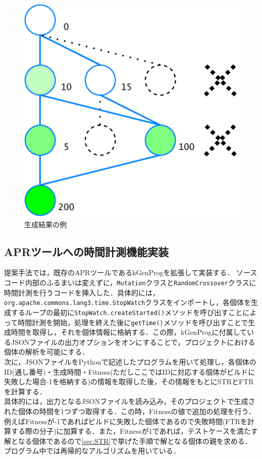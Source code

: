 \documentclass[uplatex,dvipdfmx,a4paper]{jsarticle}
\let\oldcite\cite
\renewcommand{\cite}[1]{\xspace\oldcite{#1}}
\begin{document}
\begin{figure}[t]
  \centering
  \includegraphics[width=\linewidth]{fig/astSample_STR.pdf}
  \caption{生成結果の例}
  \label{fig:example_STR}
\end{figure}
\subsection{APRツールへの時間計測機能実装} \label{sec:impl}
提案手法では，既存のAPRツールであるkGenProg\cite{higo2018kgenprog}を拡張して実装する．
ソースコード内部のふるまいは変えずに，\texttt{Mutation}クラスと\texttt{RandomCrossover}クラスに時間計測を行うコードを挿入した．具体的には，\texttt{org.apache.commons.lang3.time.StopWatch}クラスをインポートし，各個体を生成するループの最初に\texttt{StopWatch.createStarted()}メソッドを呼び出すことによって時間計測を開始，処理を終えた後に\texttt{getTime()}メソッドを呼び出すことで生成時間を取得し，それを個体情報に格納する．この際，kGenProgに付属しているJSONファイルの出力オプションをオンにすることで，プロジェクトにおける個体の解析を可能にする．\\
次に，JSONファイルをPythonで記述したプログラムを用いて処理し，各個体のID(通し番号)・生成時間・Fitness(ただしここではIDに対応する個体がビルドに失敗した場合-1を格納する)の情報を取得した後，その情報をもとにSTRとFTRを計算する．\\
具体的には，出力となるJSONファイルを読み込み，そのプロジェクトで生成された個体の時間を1つずつ取得する．この時，Fitnessの値で追加の処理を行う．例えばFitnessが-1であればビルドに失敗した個体であるので失敗時間(FTRを計算する際の分子)に加算する．また，Fitnessが1であれば，テストケースを満たす解となる個体であるので\ref{sec:STR}で挙げた手順で解となる個体の親を求める．プログラム中では再帰的なアルゴリズムを用いている．\\
\clearpage
\end{document}
